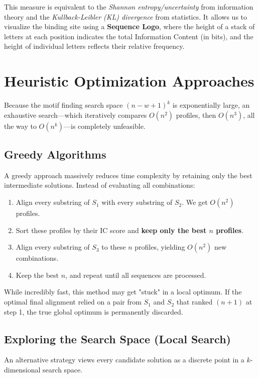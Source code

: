 \documentclass[11pt, a4paper]{article}
\begin{document}
This measure is equivalent to the \textit{Shannon entropy/uncertainty} from information theory and the \textit{Kullback-Leibler (KL) divergence} from statistics. It allows us to visualize the binding site using a \textbf{Sequence Logo}, where the height of a stack of letters at each position indicates the total Information Content (in bits), and the height of individual letters reflects their relative frequency.


\section{Heuristic Optimization Approaches}

Because the motif finding search space $(n-w+1)^k$ is exponentially large, an exhaustive search—which iteratively compares $O(n^2)$ profiles, then $O(n^3)$, all the way to $O(n^k)$—is completely unfeasible.

\subsection{Greedy Algorithms}
A greedy approach massively reduces time complexity by retaining only the best intermediate solutions. 
Instead of evaluating all combinations:
\begin{enumerate}
    \item Align every substring of $S_1$ with every substring of $S_2$. We get $O(n^2)$ profiles.
    \item Sort these profiles by their IC score and \textbf{keep only the best $n$ profiles}.
    \item Align every substring of $S_3$ to these $n$ profiles, yielding $O(n^2)$ new combinations.
    \item Keep the best $n$, and repeat until all sequences are processed.
\end{enumerate}
While incredibly fast, this method may get "stuck" in a local optimum. If the optimal final alignment relied on a pair from $S_1$ and $S_2$ that ranked $(n+1)$ at step 1, the true global optimum is permanently discarded.

\subsection{Exploring the Search Space (Local Search)}
An alternative strategy views every candidate solution as a discrete point in a $k$-dimensional search space. 
\end{document}
